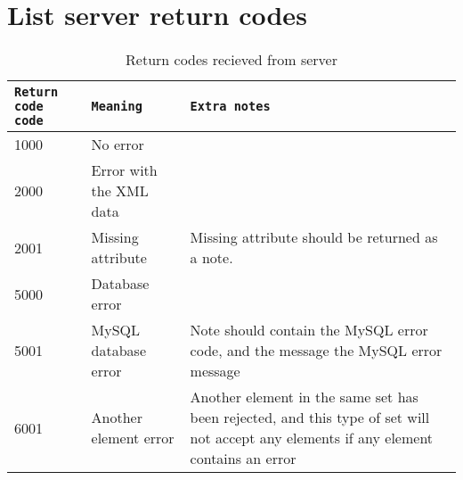 \newpage
\section{List server return codes}

\begin{table}[h]
    \centering
    \caption{Return codes recieved from server}
    \begin{tabular}{|l|l|p{5cm}|}
        \hline
        \texttt{Return code code} & \texttt{Meaning} & \texttt{Extra notes} \\
        \hline
        \hline
        1000 & No error & \\
        \hline
        \hline
        2000 & Error with the XML data & \\
        \hline
        2001 & Missing attribute & Missing attribute should be returned as a note. \\
        \hline
        \hline
        5000 & Database error & \\
        \hline
        5001 & MySQL database error & Note should contain the MySQL error code, 
        and the message the MySQL error message \\
        \hline
        \hline
        6001 & Another element error & Another element in the same set has been
        rejected, and this type of set will not accept any elements if any
        element contains an error\\
        \hline
    \end{tabular}
    \label{tbl:server_error_codes}
\end{table}
